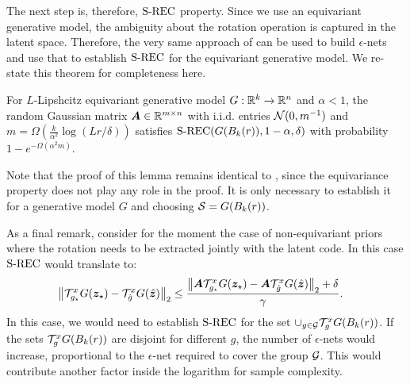 The next step is, therefore, $\text{S-REC}$ property. Since we use an equivariant generative model, the ambiguity about the rotation operation is captured in the latent space. Therefore, the very same approach of \cite{Bora2017-as} can be used to build $\epsilon$-nets and use that to establish $\text{S-REC}$ for the equivariant generative model. We re-state this theorem for completeness here.

\begin{lemma}
For $L$-Lipshcitz equivariant generative model $G:\mathbb{R}^k\to\mathbb{R}^n$ and $\alpha<1$, the random Gaussian matrix ${\bm{A}}\in\mathbb{R}^{m\times n}$ with i.i.d. entries ${\mathcal{N}}(0,m^{-1})$ and $m =\Omega\left(\frac{k}{\alpha^2} \log (Lr/\delta)\right)$ satisfies $\text{S-REC}(G(B_k(r)),1-\alpha,\delta)$ with probability $1-e^{-\Omega(\alpha^2m)}$.
\end{lemma}

Note that the proof of this lemma remains identical to \cite{Bora2017-as}, since the equivariance property does not play any role in the proof. It  is only necessary to establish it for a generative model $G$ and choosing ${\mathcal{S}}=G(B_k(r))$.

As a final remark, consider for the moment the case of non-equivariant priors where the rotation needs to be extracted jointly with the latent code. In this case $\text{S-REC}$ would translate to:
\begin{align}
    \left\|{\mathcal{T}}_{g_\star}^x G({\bm{z}}_\star)- {\mathcal{T}}_{\hat{g}}^x G(\hat{{\bm{z}}})\right\|_2&\leq 
 \frac{\left\|{\bm{A}} {\mathcal{T}}_{g_\star}^x G({\bm{z}}_\star)-{\bm{A}} {\mathcal{T}}_{\hat{g}}^x G(\hat{{\bm{z}}})\right\|_2+ \delta}{\gamma}.
\end{align}
In this case, we would need to establish $\text{S-REC}$ for the set $\cup_{g\in{\mathcal{G}}}{\mathcal{T}}_{g}^x G(B_k(r))$. If the sets ${\mathcal{T}}_{g}^x G(B_k(r))$ are disjoint for different $g$, the number of $\epsilon$-nets would increase, proportional to the $\epsilon$-net required to cover the group ${\mathcal{G}}$. This would contribute another factor inside the logarithm for sample complexity.




\newpage
